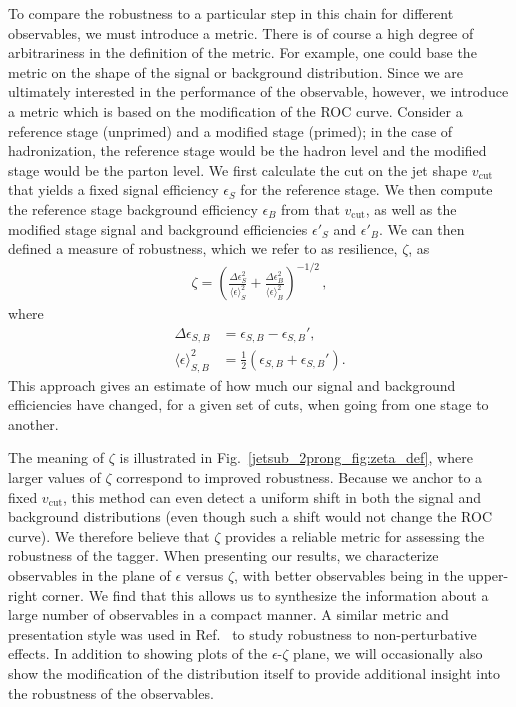 \documentclass[11pt]{cernrep}
\begin{document}
To compare the robustness to a
particular step in this chain for different observables, we must
introduce a metric.
%
There is of course a high degree of arbitrariness
in the definition of the metric.
%
For example, one could base the metric on the shape of the signal or background distribution.
%
Since we are ultimately interested in the performance of the observable, however, we introduce a metric which is based on the modification of the ROC curve.
%
Consider a reference stage (unprimed) and a modified stage (primed); in the case of hadronization, the reference stage would be the hadron level and the modified stage would be the parton level.
%
We first calculate the cut on the jet shape $v_{\text{cut}}$ that yields a fixed signal efficiency $\epsilon_S$ for the reference stage.
%
We then compute the reference stage background efficiency $\epsilon_B$ from that $v_{\text{cut}}$, as well as the modified stage signal and background efficiencies $\epsilon'_S$ and $\epsilon'_B$.
%
We can then defined a measure of robustness, which we refer to as resilience, $\zeta$, as
%
\begin{align}
\zeta=\left(  \frac{\Delta \epsilon_S^2}{ \langle \epsilon \rangle_S^2}  +\frac{\Delta \epsilon_B^2}{ \langle \epsilon \rangle_B^2}  \right)^{-1/2}\,,
\end{align}
%
where
%
\begin{align}
\Delta \epsilon_{S,B} & =\epsilon_{S,B}-\epsilon_{S,B}',\\
\langle \epsilon \rangle_{S,B}^2 & = \frac{1}{2} \left(\epsilon_{S,B} + \epsilon_{S,B}'\right).
\end{align}
%
This approach gives an estimate of how much our signal and background efficiencies have changed, for a given set of cuts, when going from one stage to another.

The meaning of $\zeta$ is illustrated in Fig.~\ref{jetsub_2prong_fig:zeta_def}, where larger values of $\zeta$ correspond to improved robustness.
%
Because we anchor to a fixed $v_{\text{cut}}$, this method can even detect a uniform shift in both the signal and background distributions (even though such a shift would not change the ROC curve).
%
We therefore believe that $\zeta$ provides a reliable metric for assessing the robustness of the tagger.
%
When presenting our results, we characterize observables
in the plane of $\epsilon$ versus $\zeta$, with better observables being in
the upper-right corner.
%
We find that this allows us to synthesize the
information about a large number of observables in a compact manner.
%
A
similar metric and presentation style was used in Ref.~\cite{Salam:2016yht}
to study robustness to non-perturbative effects.
%
In addition to
showing plots of the $\epsilon$-$\zeta$ plane, we will occasionally also show the modification of the distribution
itself to provide additional insight into the robustness of the
observables.
\end{document}
